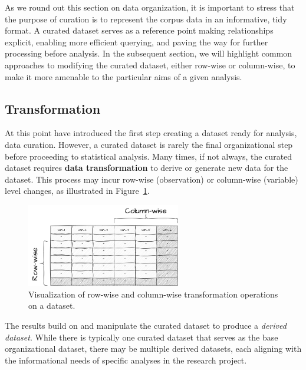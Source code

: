 \documentclass[
  letterpaper,
  DIV=11,
  numbers=noendperiod]{scrreport}
\theoremstyle{definition}
\theoremstyle{remark}
\begin{document}
As we round out this section on data organization, it is important to
stress that the purpose of curation is to represent the corpus data in
an informative, tidy format. A curated dataset serves as a reference
point making relationships explicit, enabling more efficient querying,
and paving the way for further processing before analysis. In the
subsequent section, we will highlight common approaches to modifying the
curated dataset, either row-wise or column-wise, to make it more
amenable to the particular aims of a given analysis.

\hypertarget{sec-ud-transformation}{%
\subsection{Transformation}\label{sec-ud-transformation}}

At this point have introduced the first step creating a dataset ready
for analysis, data curation. However, a curated dataset is rarely the
final organizational step before proceeding to statistical analysis.
Many times, if not always, the curated dataset requires \textbf{data
transformation} to derive or generate new data for the dataset. This
process may incur row-wise (observation) or column-wise (variable) level
changes, as illustrated in Figure~\ref{fig-ud-transformations}.

\begin{figure}[H]

{\centering \includegraphics[width=2.65in,height=\textheight]{figures/understanding-data/ud-transformations.drawio.png}

}

\caption{\label{fig-ud-transformations}Visualization of row-wise and
column-wise transformation operations on a dataset.}

\end{figure}

The results build on and manipulate the curated dataset to produce a
\emph{derived dataset}. While there is typically one curated dataset
that serves as the base organizational dataset, there may be multiple
derived datasets, each aligning with the informational needs of specific
analyses in the research project.
\end{document}
